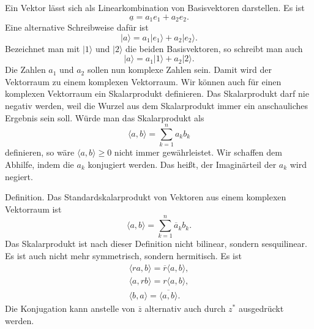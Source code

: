 \documentclass[a4paper,11pt,fleqn,twocolumn,twoside]{scrartcl}
\numberwithin{equation}{section}
\begin{document}
Ein Vektor lässt sich als Linearkombination von Basisvektoren
darstellen. Es ist
\begin{equation}
\underline a = a_1e_1+a_2e_2.
\end{equation}
Eine alternative Schreibweise dafür ist
\begin{equation}
|a\rangle = a_1|e_1\rangle+a_2|e_2\rangle.
\end{equation}
Bezeichnet man mit $|1\rangle$ und $|2\rangle$ die beiden
Basisvektoren, so schreibt man auch
\begin{equation}
|a\rangle = a_1|1\rangle+a_2|2\rangle.
\end{equation}
Die Zahlen $a_1$ und $a_2$ sollen nun komplexe Zahlen sein.
Damit wird der Vektorraum zu einem komplexen Vektorraum. Wir können
auch für einen komplexen Vektorraum ein Skalarprodukt definieren.
Das Skalarprodukt darf nie negativ werden, weil die Wurzel aus dem
Skalarprodukt immer ein anschauliches Ergebnis sein soll. Würde man
das Skalarprodukt als
\begin{equation}
\langle a,b\rangle = \sum_{k=1}^n a_kb_k
\end{equation}
definieren, so wäre $\langle a,b\rangle\geq 0$ nicht immer
gewährleistet. Wir schaffen dem Abhilfe, indem die $a_k$ konjugiert
werden. Das heißt, der Imaginärteil der $a_k$ wird negiert.

Definition. Das Standardskalarprodukt von Vektoren aus einem komplexen
Vektorraum ist
\begin{equation}
\langle a,b\rangle = \sum_{k=1}^n \overline a_kb_k.
\end{equation}
Das Skalarprodukt ist nach dieser Definition nicht bilinear, sondern
sesquilinear. Es ist auch nicht mehr symmetrisch, sondern hermitisch.
Es ist
\begin{gather}
\langle ra,b\rangle = \overline r\langle a,b\rangle,\\
\langle a,rb\rangle = r\langle a,b\rangle,\\
\langle b,a\rangle = \overline{\langle a,b\rangle}.
\end{gather}
Die Konjugation kann anstelle von $\overline z$ alternativ auch
durch $z^\ast$ ausgedrückt werden.
\end{document}
